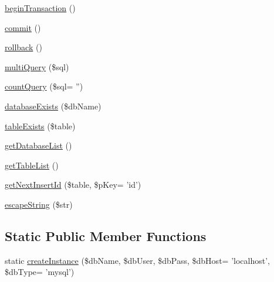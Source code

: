 \begin{DoxyCompactItemize}
\item 
\hyperlink{classTk_1_1Db_1_1Pdo_add953ef047bf4c99b6ea919991f50002}{begin\+Transaction} ()
\item 
\hyperlink{classTk_1_1Db_1_1Pdo_a60dc43f0c2d0c3119dd971e1d8d8dd12}{commit} ()
\item 
\hyperlink{classTk_1_1Db_1_1Pdo_ae364a4d8c8a9db1f119f7ba90dda5659}{rollback} ()
\item 
\hyperlink{classTk_1_1Db_1_1Pdo_a44d86c49adf9fb546bd2ef6b7a5ab4ee}{multi\+Query} (\$sql)
\item 
\hyperlink{classTk_1_1Db_1_1Pdo_a7368c44ff9e3378e710b9aa3ac428ce8}{count\+Query} (\$sql= '')
\item 
\hyperlink{classTk_1_1Db_1_1Pdo_a1385a3330a76c118812def62fb81a630}{database\+Exists} (\$db\+Name)
\item 
\hyperlink{classTk_1_1Db_1_1Pdo_a9735bf3a4d248257bfc194a5292bcb1e}{table\+Exists} (\$table)
\item 
\hyperlink{classTk_1_1Db_1_1Pdo_a102fe1d6fab551be03500df15a03e6c2}{get\+Database\+List} ()
\item 
\hyperlink{classTk_1_1Db_1_1Pdo_ac2a774eaad4a8fa8f5b4421d5de2a726}{get\+Table\+List} ()
\item 
\hyperlink{classTk_1_1Db_1_1Pdo_a739b27e568c77de416dcb08b1ea14782}{get\+Next\+Insert\+Id} (\$table, \$p\+Key= 'id')
\item 
\hyperlink{classTk_1_1Db_1_1Pdo_a86de8d8bdaaa58e1275caa93cbe47c60}{escape\+String} (\$str)
\end{DoxyCompactItemize}
\subsection*{Static Public Member Functions}
\begin{DoxyCompactItemize}
\item 
static \hyperlink{classTk_1_1Db_1_1Pdo_afd295a6ccfa1c0d57255062557f9d176}{create\+Instance} (\$db\+Name, \$db\+User, \$db\+Pass, \$db\+Host= 'localhost', \$db\+Type= 'mysql')
\end{DoxyCompactItemize}
